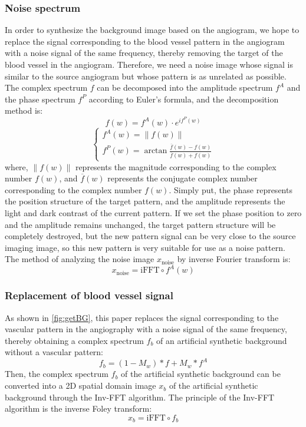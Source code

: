 \subsubsection{Noise spectrum}
In order to synthesize the background image based on the angiogram, we hope to replace the signal corresponding to the blood vessel pattern in the angiogram with a noise signal of the same frequency, thereby removing the target of the blood vessel in the angiogram. Therefore, we need a noise image whose signal is similar to the source angiogram but whose pattern is as unrelated as possible. The complex spectrum $f$ can be decomposed into the amplitude spectrum $f^A$ and the phase spectrum $f^P$ according to Euler's formula, and the decomposition method is:
\begin{equation}
f(w) = f^A(w) \cdot e^{i f^P(w)}
\end{equation}
\begin{equation}
\begin{cases}
f^A(w) = \|f(w)\| \\
f^P(w) = \arctan \frac{\overline{f}(w) - f(w)}{\overline{f}(w) + f(w)}
\end{cases}
\end{equation}
where, $\|f(w)\|$ represents the magnitude corresponding to the complex number $f(w)$, and $\overline{f}(w)$ represents the conjugate complex number corresponding to the complex number $f(w)$. Simply put, the phase represents the position structure of the target pattern, and the amplitude represents the light and dark contrast of the current pattern. If we set the phase position to zero and the amplitude remains unchanged, the target pattern structure will be completely destroyed, but the new pattern signal can be very close to the source imaging image, so this new pattern is very suitable for use as a noise pattern. The method of analyzing the noise image $x_{\text{noise}}$ by inverse Fourier transform is:
\begin{equation}
x_{\text{noise}} = \text{iFFT} \circ f^A(w)
\end{equation}


\subsubsection{Replacement of blood vessel signal}
As shown in \cref{fig:getBG}, this paper replaces the signal corresponding to the vascular pattern in the angiography with a noise signal of the same frequency, thereby obtaining a complex spectrum $f_b$ of an artificial synthetic background without a vascular pattern:
\begin{equation}
f_b = (1 - M_w) * f + M_w * f^A \tag{12}
\end{equation}
Then, the complex spectrum $f_b$ of the artificial synthetic background can be converted into a 2D spatial domain image $x_b$ of the artificial synthetic background through the Inv-FFT algorithm. The principle of the Inv-FFT algorithm is the inverse Foley transform:
\begin{equation}
x_b = \text{iFFT} \circ f_b \tag{13}
\end{equation}

